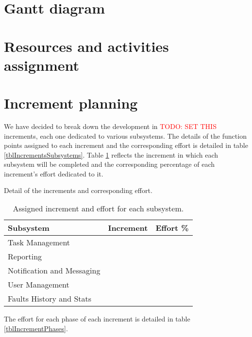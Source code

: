 

\section{Gantt diagram}

\section{Resources and activities assignment}

\section{Increment planning}

We have decided to break down the development in \textcolor{red}{TODO: SET THIS} increments, each one dedicated to various subsystems. The details of the function points assigned to each increment and the corresponding effort is detailed in table \ref{tblIncrementsSubsystems}. Table \ref{tblSubsystemsAssignedIncrement} reflects the increment in which each subsystem will be completed and the corresponding percentage of each increment's effort dedicated to it.

\begin{table}[hbtp]
\centering

\caption{Detail of the increments and corresponding effort.}
\label{tblIncrementsSubsystems}
\end{table}

\begin{table}[hbtp]
\centering
\begin{tabular}{l|c|c}
\textbf{Subsystem} & \textbf{Increment} & \textbf{Effort \%}  \\ \hline
Task Management & & \\
Reporting & & \\
Notification and Messaging & & \\
User Management & & \\
Faults History and Stats & & \\
\end{tabular}
\caption{Assigned increment and effort for each subsystem.}
\label{tblSubsystemsAssignedIncrement}
\end{table}

The effort for each phase of each increment is detailed in table \ref{tblIncrementPhases}.

